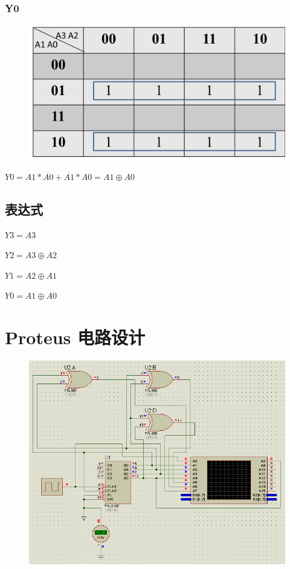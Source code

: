 \documentclass{article}
\begin{document}
\subsubsection{Y0}

\begin{figure}[!hbp]
  \centering
  \includegraphics[scale=0.45]{S7.png}
\end{figure}

$Y0 = A1 * \overline{A0} + \overline{A1} * A0 = A1 \oplus A0$

\subsection{表达式}

$Y3 = A3$

$Y2 = A3 \oplus A2$

$Y1 = A2 \oplus A1$

$Y0 = A1 \oplus A0$


\section{Proteus 电路设计}

\begin{figure}[!hbp]
  \centering
  \includegraphics[scale=0.45]{S1.png}
\end{figure}
\end{document}

